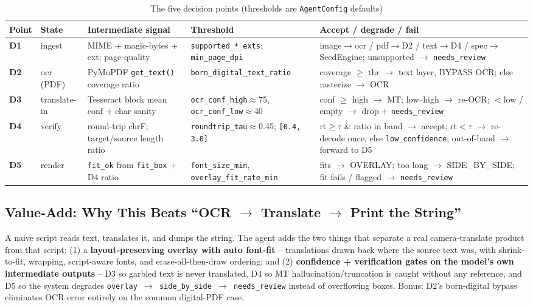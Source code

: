 \documentclass[12pt,a4paper]{article}
\begin{document}
\begin{table}[H]
\centering
\caption{The five decision points (thresholds are \texttt{AgentConfig} defaults)}
\scriptsize
\setlength{\tabcolsep}{3pt}
\begin{tabularx}{\linewidth}{@{} l l L l L @{}}
\toprule
\textbf{Point} & \textbf{State} & \textbf{Intermediate signal} & \textbf{Threshold} & \textbf{Accept / degrade / fail} \\
\midrule
\textbf{D1} & ingest & MIME + magic-bytes + ext; page-quality & \texttt{supported\_*\_exts}; \texttt{min\_page\_dpi} & image$\rightarrow$ocr / pdf$\rightarrow$D2 / text$\rightarrow$D4 / spec$\rightarrow$SeedEngine; unsupported $\rightarrow$ \texttt{needs\_review} \\
\textbf{D2} & ocr (PDF) & PyMuPDF \texttt{get\_text()} coverage ratio & \texttt{born\_digital\_text\_ratio} & coverage $\geq$ thr $\rightarrow$ text layer, BYPASS OCR; else rasterize $\rightarrow$ OCR \\
\textbf{D3} & translate-in & Tesseract block mean conf + char sanity & \texttt{ocr\_conf\_high}$\approx$75, \texttt{ocr\_conf\_low}$\approx$40 & conf $\geq$ high $\rightarrow$ MT; low--high $\rightarrow$ re-OCR; $<$low / empty $\rightarrow$ drop + \texttt{needs\_review} \\
\textbf{D4} & verify & round-trip chrF; target/source length ratio & \texttt{roundtrip\_tau}$\approx$0.45; \texttt{[0.4, 3.0]} & rt$\geq\tau$ \& ratio in band $\rightarrow$ accept; rt$<\tau$ $\rightarrow$ re-decode once, else \texttt{low\_confidence}; out-of-band $\rightarrow$ forward to D5 \\
\textbf{D5} & render & \texttt{fit\_ok} from \texttt{fit\_box} + D4 ratio & \texttt{font\_size\_min}, \texttt{overlay\_fit\_rate\_min} & fits $\rightarrow$ OVERLAY; too long $\rightarrow$ SIDE\_BY\_SIDE; fit fails / flagged $\rightarrow$ \texttt{needs\_review} \\
\bottomrule
\end{tabularx}
\end{table}

\subsection{Value-Add: Why This Beats ``OCR $\rightarrow$ Translate $\rightarrow$ Print the String''}

A naive script reads text, translates it, and dumps the string. The agent adds the two things that separate a real camera-translate product from that script: (1) a \textbf{layout-preserving overlay with auto font-fit} -- translations drawn back where the source text was, with shrink-to-fit, wrapping, script-aware fonts, and erase-all-then-draw ordering; and (2) \textbf{confidence + verification gates on the model's own intermediate outputs} -- D3 so garbled text is never translated, D4 so MT hallucination/truncation is caught without any reference, and D5 so the system degrades \texttt{overlay $\rightarrow$ side\_by\_side $\rightarrow$ needs\_review} instead of overflowing boxes. Bonus: D2's born-digital bypass eliminates OCR error entirely on the common digital-PDF case.
\end{document}
